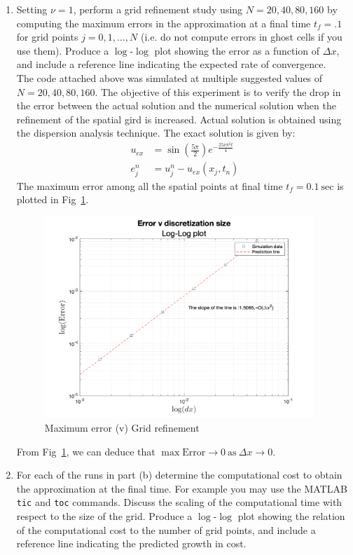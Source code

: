 \documentclass[11pt]{article}
\begin{document}
\begin{enumerate}
\begin{enumerate}
  \item {\color{blue}Setting} $\nu=1$, {\color{blue}perform a grid refinement study using} $N=20,40,80,160$ {\color{blue}by computing the maximum errors in the approximation at a final time} $t_f=.1$ {\color{blue}for grid points} $j=0,1,\ldots,N$ {\color{blue}(i.e. do not compute errors in ghost cells if you use them). Produce a }$\log$-$\log$ {\color{blue}plot showing the error as a function of} $\Delta x$, {\color{blue}and include a reference line indicating the expected rate of convergence.} \\
  
The code attached above was simulated at multiple suggested values of $N = 20,40,80,160$. The objective of this experiment is to verify the drop in the error between the actual solution and the numerical solution when the refinement of the spatial gird is increased. Actual solution is obtained using the dispersion analysis technique. The exact solution is given by:
\begin{align*}
u_{ex} & = \sin{\left(\frac{5\pi}{2}\right)}e^{-\frac{25\nu \pi^2 t}{4}} \\
e^n_j & = u^n_j - u_{ex}(x_j,t_n) 
\end{align*}
The maximum error among all the spatial points at final time $t_f = 0.1 \ \text{sec}$ is plotted in Fig~\ref{fig:q3b}.
\begin{figure}[htp]
\begin{center}
\includegraphics[width=4in]{Err_plot}
\end{center}
\caption{Maximum error (v) Grid refinement}
\label{fig:q3b}
\end{figure}
From Fig~\ref{fig:q3b}, we can deduce that $\max{\text{Error}} \rightarrow 0 \ \text{as} \ \Delta x \rightarrow 0$.
  
  \item {\color{blue}For each of the runs in part (b) determine the computational cost to obtain the approximation at the final time. For example you may use the MATLAB} {\tt tic} {\color{blue}and} {\tt toc} {\color{blue}commands. Discuss the scaling of the computational time with respect to the size of the grid. Produce a} $\log$-$\log$ {\color{blue}plot showing the relation of the computational cost to the number of grid points, and include a reference line indicating the predicted growth in cost.}\\


\end{enumerate}
\end{enumerate}
\end{document}
